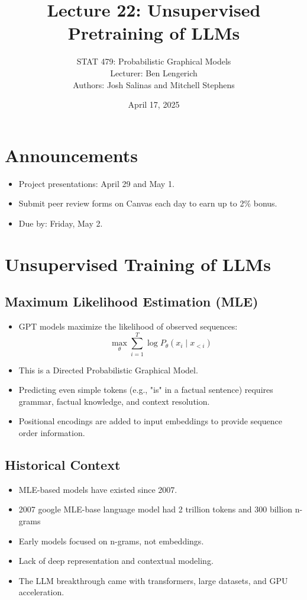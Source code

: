 \documentclass[11pt]{article}
\title{Lecture 22: Unsupervised Pretraining of LLMs}
\author{STAT 479: Probabilistic Graphical Models\\Lecturer: Ben Lengerich\\Authors: Josh Salinas and Mitchell Stephens}
\date{April 17, 2025}
\begin{document}
\maketitle

\section*{Announcements}
\begin{itemize}
    \item Project presentations: April 29 and May 1.
    \item Submit peer review forms on Canvas each day to earn up to 2\% bonus.
    \item Due by: Friday, May 2.
\end{itemize}

\section{Unsupervised Training of LLMs}
\subsection*{Maximum Likelihood Estimation (MLE)}
\begin{itemize}
    \item GPT models maximize the likelihood of observed sequences:
    \[ \max_{\theta} \sum_{i=1}^T \log P_{\theta}(x_i \mid x_{<i}) \]
    \item This is a Directed Probabilistic Graphical Model.
    \item Predicting even simple tokens (e.g., "is" in a factual sentence) requires grammar, factual knowledge, and context resolution.
    \item Positional encodings are added to input embeddings to provide sequence order information.
\end{itemize}

\subsection*{Historical Context}
\begin{itemize}
    \item MLE-based models have existed since 2007.
    \item 2007 google MLE-base language model had 2 trillion tokens and 300 billion n-grams
    \item Early models focused on n-grams, not embeddings.
    \item Lack of deep representation and contextual modeling.
    \item The LLM breakthrough came with transformers, large datasets, and GPU acceleration.
\end{itemize}
\end{document}
